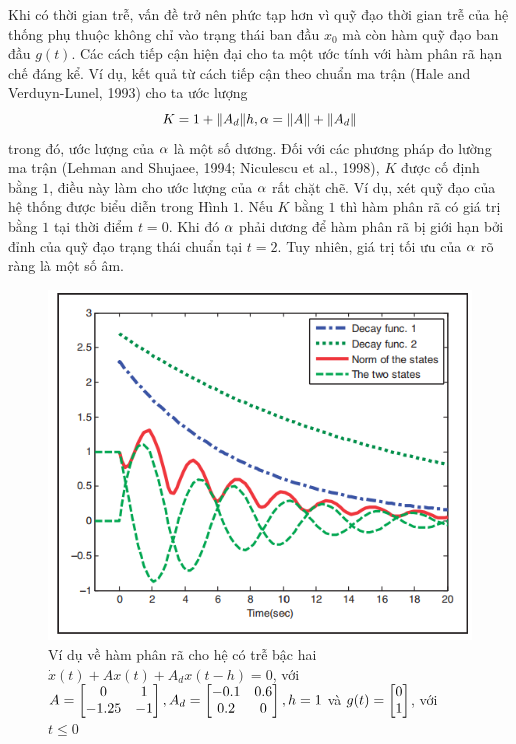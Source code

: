 %
Khi có thời gian trễ, vấn đề trở nên phức tạp hơn vì quỹ đạo thời gian trễ của hệ thống phụ thuộc không chỉ vào trạng thái ban đầu $x_0$ mà còn hàm quỹ đạo ban đầu  $g(t)$. Các cách tiếp cận hiện đại cho ta một ước tính với hàm phân rã hạn chế đáng kể. Ví dụ, kết quả từ cách tiếp cận theo chuẩn ma trận (Hale and Verduyn-Lunel, 1993) cho ta ước lượng
%
\begin{equation}\label{4}
	K = 1 + \Vert A_d \Vert h, \alpha = \Vert A \Vert + \Vert A_d \Vert
\end{equation}
%
trong đó, ước lượng của $\alpha$ là một số dương. Đối với các phương pháp đo lường ma trận (Lehman and Shujaee, 1994; Niculescu et al., 1998), $K$ được cố định bằng $1$, điều này làm cho ước lượng của $\alpha$ rất chặt chẽ. Ví dụ, xét quỹ đạo của hệ thống được biểu diễn trong Hình $1$. Nếu $K$ bằng $1$ thì hàm phân rã có giá trị bằng $1$ tại thời điểm $t=0$. Khi đó $\alpha$ phải dương để hàm phân rã bị giới hạn bởi đỉnh của quỹ đạo trạng thái chuẩn tại $t = 2$. Tuy nhiên, giá trị tối ưu của $\alpha$ rõ ràng là một số âm.
\begin{figure}[h!]
	\centering
	\includegraphics[scale= 0.7]{"./Hinh/Hinh11"}
	\caption[Ví dụ về hàm phân rã cho hệ có trễ bậc hai $\dot{x}(t) + Ax(t) + A_dx(t-h)= 0$, với $A = \m{0& 1\\ -1.25& -1}, A_d= \m{-0.1&0.6 \\ 0.2&0}, h = 1$ và $g(t)= \m{0\\1}$, với $t \le 0$]{Ví dụ về hàm phân rã cho hệ có trễ bậc hai $\dot{x}(t) + Ax(t) + A_dx(t-h)= 0$, với $A = \m{0& 1\\ -1.25& -1}, A_d= \m{-0.1&0.6 \\ 0.2&0}, h = 1$ và $g(t)= \m{0\\1}$, với $t \le 0$}
	\label{fig:hinh-11}
\end{figure}
